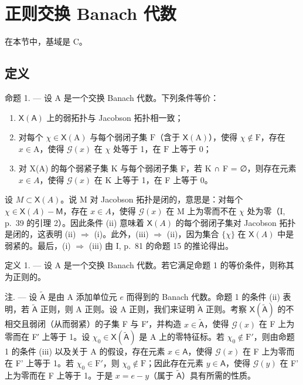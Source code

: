 \section{正则交换 Banach 代数}

在本节中，基域是 C。

\subsection{定义}

命题 1. --- 设 A 是一个交换 Banach 代数。下列条件等价：

\begin{enumerate}
\def\labelenumi{(\roman{enumi})}
\item
  \(\mathsf{X}(\mathsf{A})\) 上的弱拓扑与 Jacobson 拓扑相一致；
\item
  对每个 \(\chi \in \mathsf{X}(\mathrm{A})\) 与每个弱闭子集 \(\mathrm{F}\)（含于 \(\mathsf{X}(\mathrm{A})\)），使得 \(\chi \notin \mathrm{F}\)，存在 \(x \in \mathrm{A}\)，使得 \(\mathcal{G}(x)\) 在 \(\chi\) 处等于 1，在 \(\mathrm{F}\) 上等于 0；
\item
  对 X(A) 的每个弱紧子集 K 与每个弱闭子集 F，若 K ∩ F = ∅，则存在元素 \(x \in A\)，使得 \(\mathcal{G}(x)\) 在 K 上等于 1，在 F 上等于 0。
\end{enumerate}

设 \(M \subset \mathsf{X}(A)\)。说 M 对 Jacobson 拓扑是闭的，意思是：对每个 \(\chi \in \mathsf{X}(A) - \mathsf{M}\)，存在 \(x \in A\)，使得 \(\mathcal{G}(x)\) 在 M 上为零而不在 \(\chi\) 处为零（I, p.~39 的引理 2）。因此条件 (ii) 意味着 \(\mathsf{X}(A)\) 的每个弱闭子集对 Jacobson 拓扑是闭的，这表明 (ii) \(\Longrightarrow\) (i)。此外，(iii) \(\Longrightarrow\) (ii)，因为集合 \(\{\chi\}\) 在 \(\mathsf{X}(A)\) 中是弱紧的。最后，(i) \(\Longrightarrow\) (iii) 由 I, p.~81 的命题 15 的推论得出。

定义 1. --- 设 A 是一个交换 Banach 代数。若它满足命题 1 的等价条件，则称其为正则的。

注. --- 设 \(\tilde{\mathsf{A}}\) 是由 A 添加单位元 \(e\) 而得到的 Banach 代数。命题 1 的条件 (ii) 表明，若 \(\tilde{\mathsf{A}}\) 正则，则 A 正则。设 A 正则，我们来证明 \(\tilde{\mathsf{A}}\) 正则。考察 \(\mathsf{X}(\tilde{\mathsf{A}})\) 的不相交且弱闭（从而弱紧）的子集 F 与 F′，并构造 \(x \in \tilde{\mathsf{A}}\)，使得 \(\mathcal{G}(x)\) 在 F 上为零而在 F′ 上等于 1。设 \(\chi_0 \in \mathsf{X}(\tilde{\mathsf{A}})\) 是 A 上的零特征标。若 \(\chi_0 \notin \mathrm{F}'\)，则由命题 1 的条件 (iii) 以及关于 A 的假设，存在元素 \(x \in \mathsf{A}\)，使得 \(\mathcal{G}(x)\) 在 F 上为零而在 F' 上等于 1。若 \(\chi_0 \in \mathrm{F}'\)，则 \(\chi_0 \notin \mathrm{F}\)；因此存在元素 \(y \in \mathsf{A}\)，使得 \(\mathcal{G}(y)\) 在 F' 上为零而在 F 上等于 1。于是 \(x = e - y\)（属于 \(\tilde{\mathsf{A}}\)）具有所需的性质。

